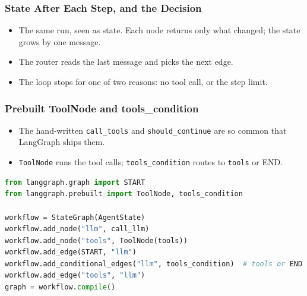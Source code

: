 \begin{frame}[fragile]\frametitle{State After Each Step, and the Decision}
\begin{itemize}
\item The same run, seen as state. Each node returns only what changed; the state grows by one message.
\item The router reads the last message and picks the next edge.
\end{itemize}
\begin{center}
\small
{}
\end{center}
\begin{itemize}
\item The loop stops for one of two reasons: no tool call, or the step limit.
\end{itemize}
\end{frame}

\begin{frame}[fragile]\frametitle{Prebuilt ToolNode and tools\_condition}
      \begin{itemize}
        \item The hand-written \texttt{call\_tools} and \texttt{should\_continue} are so common that LangGraph ships them.
        \item \texttt{ToolNode} runs the tool calls; \texttt{tools\_condition} routes to \texttt{tools} or END.
      \end{itemize}
\begin{lstlisting}[language=Python]
from langgraph.graph import START
from langgraph.prebuilt import ToolNode, tools_condition

workflow = StateGraph(AgentState)
workflow.add_node("llm", call_llm)
workflow.add_node("tools", ToolNode(tools))
workflow.add_edge(START, "llm")
workflow.add_conditional_edges("llm", tools_condition)  # tools or END
workflow.add_edge("tools", "llm")
graph = workflow.compile()
\end{lstlisting}
\end{frame}

